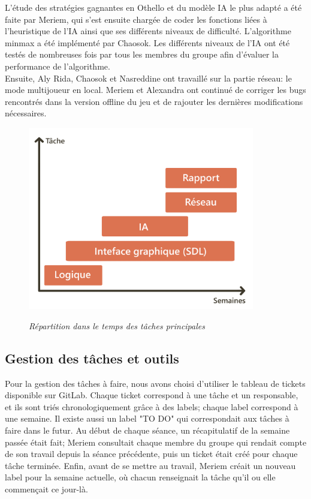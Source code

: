 \documentclass[12pt, a4paper, oneside]{article}
\begin{document}
L'étude des stratégies gagnantes en Othello et du modèle IA le plus adapté a été faite par Meriem, qui s'est ensuite chargée de coder
les fonctions liées à l'heuristique de l'IA ainsi que ses différents niveaux de difficulté. L'algorithme minmax a été implémenté par
Chaosok. Les différents niveaux de l'IA ont été testés de nombreuses fois par tous les membres du groupe afin d'évaluer la performance
de l'algorithme. \\

Ensuite, Aly Rida, Chaosok et Nasreddine ont travaillé sur la partie réseau: le mode multijoueur en local. Meriem et Alexandra ont
continué de corriger les bugs rencontrés dans la version offline du jeu et de rajouter les dernières modifications nécessaires.

        \begin{figure}[h]
            \begin{center}
            \includegraphics[height=8cm]{gantt.png}\\
            \caption{\textit{Répartition dans le temps des tâches principales}}
            \end{center}
        \end{figure}

    \subsection{Gestion des tâches et outils}
    Pour la gestion des tâches à faire, nous avons choisi d'utiliser le tableau de tickets disponible sur GitLab. Chaque ticket correspond 
    à une tâche et un responsable, et ils sont triés chronologiquement grâce à des labels; chaque label correspond à une semaine. Il
    existe aussi un label "TO DO" qui correspondait aux tâches à faire dans le futur. Au début de chaque séance, un récapitulatif de la
    semaine passée était fait; Meriem consultait chaque membre du groupe qui rendait compte de son travail depuis la séance précédente,
    puis un ticket était créé pour chaque tâche terminée. Enfin, avant de se mettre au travail, Meriem créait un nouveau label pour la
    semaine actuelle, où chacun renseignait la tâche qu'il ou elle commençait ce jour-là. \\
    
\end{document}
